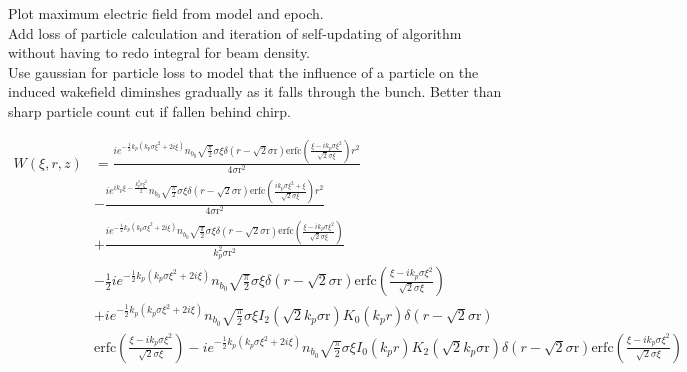 \newpage
Plot maximum electric field from model and epoch.\\
Add loss of particle calculation and iteration of self-updating of algorithm without having to redo integral for beam density.\\
Use gaussian for particle loss to model that the influence of a particle on the induced wakefield diminshes gradually as it falls through the bunch. Better than sharp particle count cut if fallen behind chirp.




\newpage
\begin{equation}
\label{WApprox}
\begin{split}
W\left(\xi,r,z\right)&=\frac{i e^{-\frac{1}{2} k_p\left(k_p\sigma \xi ^2+2 i \xi \right)}n_{b_0} \sqrt{\frac{\pi }{2}} \sigma \xi  \delta
   \left(r-\sqrt{2} \text{$\sigma $r}\right) \text{erfc}\left(\frac{\xi -i k_p\sigma \xi ^2}{\sqrt{2} \sigma \xi }\right) r^2}{4
   \text{$\sigma $r}^2}\\
   &-\frac{i e^{i k_p\xi -\frac{k_p^2 \sigma \xi ^2}{2}}n_{b_0} \sqrt{\frac{\pi }{2}} \sigma \xi  \delta
   \left(r-\sqrt{2} \text{$\sigma $r}\right) \text{erfc}\left(\frac{i k_p\sigma \xi ^2+\xi }{\sqrt{2} \sigma \xi }\right) r^2}{4
   \text{$\sigma $r}^2}\\
   &+\frac{i e^{-\frac{1}{2} k_p\left(k_p\sigma \xi ^2+2 i \xi \right)}n_{b_0} \sqrt{\frac{\pi }{2}} \sigma \xi
    \delta \left(r-\sqrt{2} \text{$\sigma $r}\right) \text{erfc}\left(\frac{\xi -i k_p\sigma \xi ^2}{\sqrt{2} \sigma \xi
   }\right)}{k_p^2 \text{$\sigma $r}^2}\\
   &-\frac{1}{2} i e^{-\frac{1}{2} k_p\left(k_p\sigma \xi ^2+2 i \xi \right)}n_{b_0}
   \sqrt{\frac{\pi }{2}} \sigma \xi  \delta \left(r-\sqrt{2} \text{$\sigma $r}\right) \text{erfc}\left(\frac{\xi -i k_p\sigma \xi
   ^2}{\sqrt{2} \sigma \xi }\right)\\
   &+i e^{-\frac{1}{2} k_p\left(k_p\sigma \xi ^2+2 i \xi \right)}n_{b_0} \sqrt{\frac{\pi }{2}}\sigma \xi  I_2\left(\sqrt{2} k_p\text{$\sigma $r}\right) K_0(k_pr) \delta \left(r-\sqrt{2} \text{$\sigma $r}\right)\\
   &\text{erfc}\left(\frac{\xi -i k_p\sigma \xi ^2}{\sqrt{2} \sigma \xi }\right)-i e^{-\frac{1}{2} k_p\left(k_p\sigma \xi ^2+2 i
   \xi \right)}n_{b_0} \sqrt{\frac{\pi }{2}} \sigma \xi  I_0(k_pr) K_2\left(\sqrt{2} k_p\text{$\sigma $r}\right) \delta
   \left(r-\sqrt{2} \text{$\sigma $r}\right) \text{erfc}\left(\frac{\xi -i k_p\sigma \xi ^2}{\sqrt{2} \sigma \xi }\right)\\

\end{split}
\end{equation}
